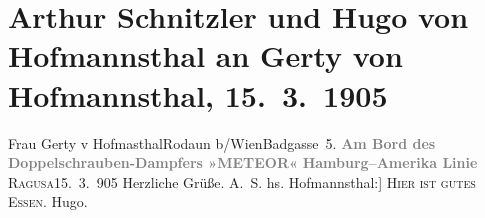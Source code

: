

         
         \renewcommand{\erwaehntePersonen}{Personen: Hugo von Hofmannsthal, Gertrude von Hofmannsthal}
         \renewcommand{\erwaehnteOrte}{Orte: Amerika, Badgasse, Dubrovnik, Hamburg, Rijeka, Rodaun}
         \renewcommand{\erwaehnteWerke}{}
               \section[Arthur Schnitzler und Hugo von Hofmannsthal an Gerty von Hofmannsthal, 15. 3. 1905]{ Arthur Schnitzler und Hugo von Hofmannsthal an Gerty von Hofmannsthal,
               15. 3. 1905}\nopagebreak{}\rehead{ }\begin{ledgroupsized}[t]{13cm}\normalsize\beginnumbering \toendnotes[C]{\smallbreak\pagebreak[2]} 
\pstart{}{\pb}Frau Gerty v Hofma{\geminationn}sthal\pend{}\pstart{}Rodaun b/Wien\pend{}\pstart{}Badgasse 5.\pend{}{\bigskip}\pstart
           \noindent{}\centering{}\textcolor{gray}{\textbf{{\pb}Am Bord des Doppelschrauben-Dampfers »METEOR«}}\pend
           \pstart
           \noindent{}\centering{}\textcolor{gray}{\textbf{Hamburg–Amerika Linie}}\pend
           \pstart
           {\pb}\textsc{Ragusa}15. 3. 905\pend
           \pstart
           Herzliche Grüße.\pend
           \pstart \spacefill\mbox{A. S.}\pend{}\pstart
           \noindent{}{[}hs. Hofmannsthal:{]} \textsc{Hier ist gutes Essen.}\pend
           \pstart \spacefill\mbox{Hugo.}\pend{}
         
         \endnumbering{}\end{ledgroupsized}  \newcommand{\dateiname}{L01509}\newcommand{\titel}{Arthur Schnitzler und Hugo von Hofmannsthal an Gerty von Hofmannsthal, 15. 3. 1905}\newcommand{\editorInnen}{Martin Anton Müller und Gerd-Hermann Susen}
      